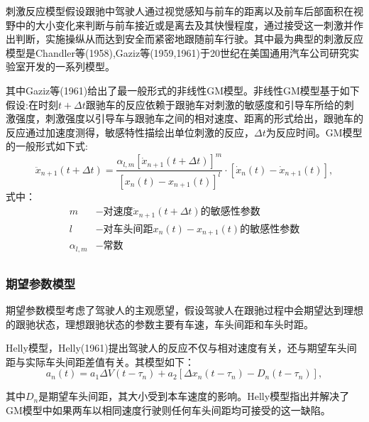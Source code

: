 刺激反应模型假设跟驰中驾驶人通过视觉感知与前车的距离以及前车后部面积在视野中的大小变化来判断与前车接近或是离去及其快慢程度，通过接受这一刺激并作出判断，实施操纵从而达到安全而紧密地跟随前车行驶。其中最为典型的刺激反应模型是Chandler等(1958),Gaziz等(1959,1961)于20世纪在美国通用汽车公司研究实验室开发的一系列模型\cite{Chandler1958,Gazis1959,Gazis1961}。

其中Gaziz等(1961)给出了最一般形式的非线性GM模型\cite{Gazis1961}。非线性GM模型基于如下假设:在时刻$t+\Delta t$跟驰车的反应依赖于跟驰车对刺激的敏感度和引导车所给的刺激强度，刺激强度以引导车与跟驰车之间的相对速度、距离的形式给出，跟驰车的反应通过加速度测得，敏感特性描绘出单位刺激的反应，$\Delta t$为反应时间。GM模型的一般形式如下式:
\begin{equation}
\ddot{x}_{n+1}(t+\Delta t)=\frac{\alpha_{l,m}[\dot{x}_{n+1}(t+\Delta t)]^m}{[x_n(t)-x_{n+1}(t)]^l}\cdot [\dot{x}_n(t)-\dot{x}_{n+1}(t)],
\end{equation}
式中：
\begin{displaymath}
{\begin{aligned}
m&-\text{对速度}\dot{x}_{n+1}(t+\Delta t)\text{的敏感性参数}\\
l&-\text{对车头间距}x_n(t)-x_{n+1}(t)\text{的敏感性参数}\\
\alpha_{l,m}&-\text{常数}\\
\end{aligned}}
\end{displaymath}



\subsubsection{期望参数模型}
期望参数模型考虑了驾驶人的主观愿望，假设驾驶人在跟驰过程中会期望达到理想的跟驰状态，理想跟驰状态的参数主要有车速，车头间距和车头时距。

Helly模型，Helly(1961)提出驾驶人的反应不仅与相对速度有关，还与期望车头间距与实际车头间距差值有关\cite{Helly1961}。其模型如下：
\begin{equation}
a_n(t)=a_1\Delta V(t-\tau_n)+a_2[\Delta x_n(t-\tau_n)-D_n(t-\tau_n)],
\end{equation}

其中$D_n$是期望车头间距，其大小受到本车速度的影响。Helly模型指出并解决了GM模型中如果两车以相同速度行驶则任何车头间距均可接受的这一缺陷。

